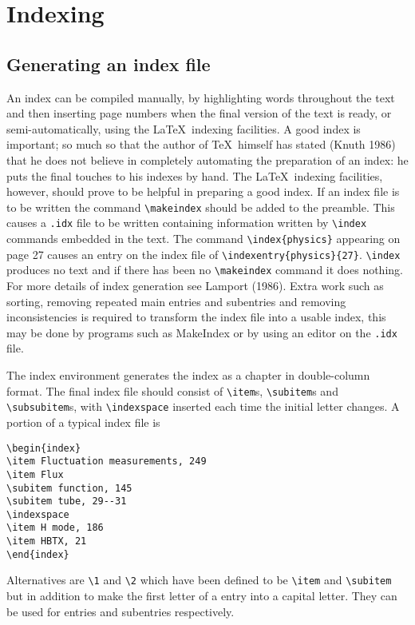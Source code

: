\chapter{Indexing}
\section{Generating an index file}
An index can be compiled manually, by highlighting words 
throughout the text and then inserting page numbers when the final 
version of the text is ready, or semi-automatically, using the \LaTeX\
indexing facilities. A good index is important; so much so that the author 
of \TeX\ himself has stated (Knuth 1986) that he does not 
believe in completely 
automating the preparation of an index: he puts the final touches to 
his indexes by hand. The \LaTeX\ indexing facilities, 
however, should prove to be  
helpful in preparing a good index. If an index file is to be written 
the command \verb"\makeindex" should be added to the preamble.
This causes a \verb".idx" file  to be written containing information
written by \verb"\index" commands embedded in the text.
The command \verb"\index{physics}" appearing on page 27 causes an 
entry on the index file of 
\verb"\indexentry{physics}{27}". \verb"\index" produces no text and if
there has been no \verb"\makeindex" command it does nothing. For more
details of index generation see Lamport (1986).
Extra work such as sorting, removing repeated main entries and 
subentries and removing inconsistencies 
is required to transform the index file into 
a usable index, this may be done by  programs such as MakeIndex or by
using an editor on the \verb".idx" file.

The index environment generates the index as a chapter in
double-column 
format. 
The final index file should consist of \verb"\item"s, \verb"\subitem"s and
\verb"\subsubitem"s, with \verb"\indexspace" inserted each time the initial letter
changes. A portion of a typical index file is
\begin{verbatim}
\begin{index}
\item Fluctuation measurements, 249
\item Flux
\subitem function, 145
\subitem tube, 29--31
\indexspace
\item H mode, 186
\item HBTX, 21
\end{index}
\end{verbatim}
Alternatives are \verb"\1" and
\verb"\2" which have been defined to be \verb"\item" and \verb"\subitem"
but in addition to make the first letter of a entry into a capital
letter. They can be used for entries and subentries respectively. 




